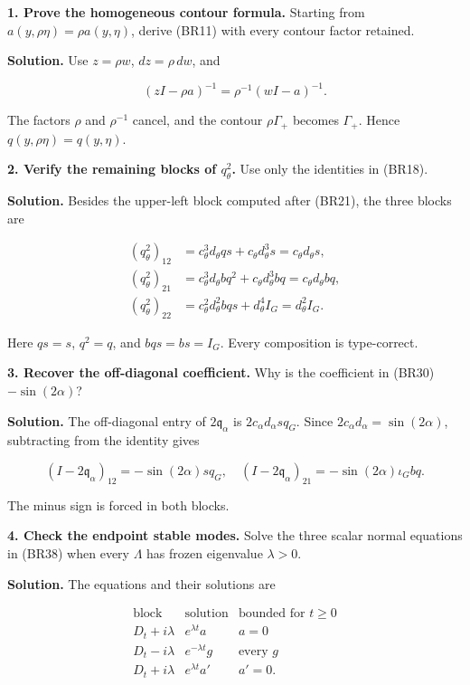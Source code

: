 \documentclass[
  11pt,
]{article}
\begin{document}
\textbf{1. Prove the homogeneous contour formula.} Starting from
\(a(y,\rho\eta)=\rho a(y,\eta)\), derive (BR11) with every contour
factor retained.

\textbf{Solution.} Use \(z=\rho w\), \(dz=\rho\,dw\), and

\[
 (zI-\rho a)^{-1}
 =\rho^{-1}(wI-a)^{-1}.
 \tag{BR52}
\]

The factors \(\rho\) and \(\rho^{-1}\) cancel, and the contour
\(\rho\Gamma_+\) becomes \(\Gamma_+\). Hence
\(q(y,\rho\eta)=q(y,\eta)\).

\textbf{2. Verify the remaining blocks of \(q_\theta^2\).} Use only the
identities in (BR18).

\textbf{Solution.} Besides the upper-left block computed after (BR21),
the three blocks are

\[
 \begin{aligned}
 (q_\theta^2)_{12}
 &=c_\theta^3d_\theta qs+c_\theta d_\theta^3s
 =c_\theta d_\theta s,\\
 (q_\theta^2)_{21}
 &=c_\theta^3d_\theta bq^2+c_\theta d_\theta^3bq
 =c_\theta d_\theta bq,\\
 (q_\theta^2)_{22}
 &=c_\theta^2d_\theta^2bqs+d_\theta^4I_G
 =d_\theta^2I_G .
 \end{aligned}
 \tag{BR53}
\]

Here \(qs=s\), \(q^2=q\), and \(bqs=bs=I_G\). Every composition is
type-correct.

\textbf{3. Recover the off-diagonal coefficient.} Why is the coefficient
in (BR30) \(-\sin(2\alpha)\)?

\textbf{Solution.} The off-diagonal entry of \(2\mathfrak q_\alpha\) is
\(2c_\alpha d_\alpha sq_G\). Since \(2c_\alpha d_\alpha=\sin(2\alpha)\),
subtracting from the identity gives

\[
 (I-2\mathfrak q_\alpha)_{12}
 =-\sin(2\alpha)sq_G ,
 \quad
 (I-2\mathfrak q_\alpha)_{21}
 =-\sin(2\alpha)\iota_Gbq .
 \tag{BR54}
\]

The minus sign is forced in both blocks.

\textbf{4. Check the endpoint stable modes.} Solve the three scalar
normal equations in (BR38) when every \(\Lambda\) has frozen eigenvalue
\(\lambda>0\).

\textbf{Solution.} The equations and their solutions are

\[
 \begin{array}{c|c|c}
 \text{block}&\text{solution}&\text{bounded for }t\geq0\\ \hline
 D_t+i\lambda&e^{\lambda t}a&a=0\\
 D_t-i\lambda&e^{-\lambda t}g&\text{every }g\\
 D_t+i\lambda&e^{\lambda t}a'&a'=0 .
 \end{array}
 \tag{BR55}
\]
\end{document}
